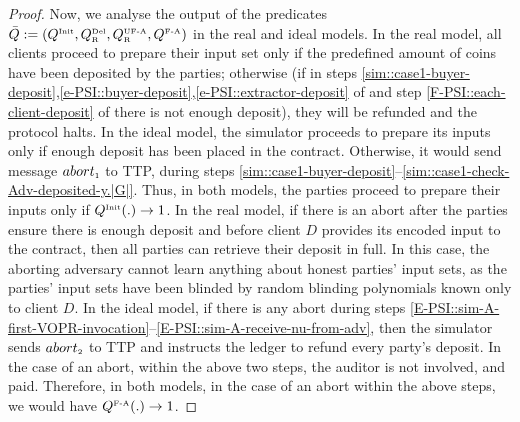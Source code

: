 \begin{proof}
Now, we analyse the output of the predicates $\bar Q:=(Q^{\scriptscriptstyle \text{Init}},  Q^{\scriptscriptstyle \text{Del}}_{\scriptscriptstyle\text{R}}, Q^{\scriptscriptstyle \text{UF-A}}_{\scriptscriptstyle \text{R}}, Q^{\scriptscriptstyle \text{F-A}})$ in the real and ideal models. In the real model, all clients proceed to prepare their input set only if the predefined amount of coins have been deposited by the parties; otherwise (if in steps \ref{sim::case1-buyer-deposit},\ref{e-PSI::buyer-deposit},\ref{e-PSI::extractor-deposit} of \epsi and step \ref{F-PSI::each-client-deposit} of \fpsi there is not enough deposit), they will be refunded and the protocol halts. In the ideal model, the simulator proceeds to prepare its inputs only if enough deposit has been placed in the contract. Otherwise, it would send message $abort_{\scriptscriptstyle 1}$ to TTP, during steps \ref{sim::case1-buyer-deposit}--\ref{sim::case1-check-Adv-deposited-y.|G|}. Thus, in both models, the parties proceed to prepare their inputs only if $Q^{\scriptscriptstyle \text{Init}}(.) \rightarrow1$.  
%
In the real model, if there is an abort after the parties ensure there is enough deposit and before client $D$ provides its encoded input to the contract, then all parties can retrieve their deposit in full. In this case, the aborting adversary cannot learn anything about honest parties' input sets, as the parties' input sets have been blinded by random blinding polynomials known only to client $D$. In the ideal model, if there is any abort during steps \ref{E-PSI::sim-A-first-VOPR-invocation}--\ref{E-PSI::sim-A-receive-nu-from-adv}, then the simulator sends $abort_{\scriptscriptstyle 2}$ to TTP and instructs the ledger to refund every party's deposit. In the case of an abort, within the above two steps, the auditor is not involved, and paid. Therefore, in both models,  in the case of an abort within the above steps, we would have $Q^{\scriptscriptstyle \text{F-A}}(.)\rightarrow1$. 





\end{proof}
